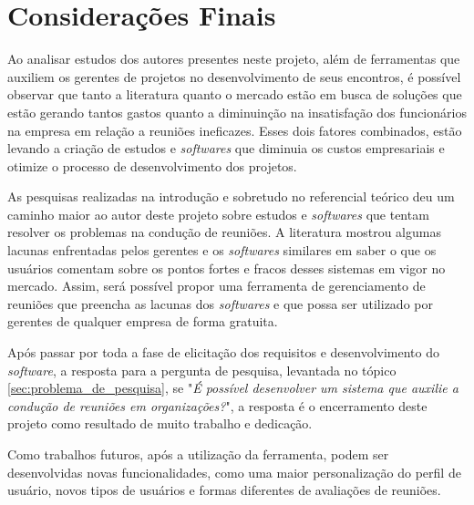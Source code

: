\chapter{Considerações Finais}
\label{cp:consideracoes}

Ao analisar estudos dos autores presentes neste projeto, além de ferramentas que auxiliem os gerentes de projetos no desenvolvimento de seus encontros, é possível observar que tanto a literatura quanto o mercado estão em busca de soluções que estão gerando tantos gastos quanto a diminuinção na insatisfação dos funcionários na empresa em relação a reuniões ineficazes. Esses dois fatores combinados, estão levando a criação de estudos e \textit{softwares} que diminuia os custos empresariais e otimize o processo de desenvolvimento dos projetos.

As pesquisas realizadas na introdução e sobretudo no referencial teórico deu um caminho maior ao autor deste projeto sobre estudos e \textit{softwares} que tentam resolver os problemas na condução de reuniões. A literatura mostrou algumas lacunas enfrentadas pelos gerentes e os \textit{softwares} similares em saber o que os usuários comentam sobre os pontos fortes e fracos desses sistemas em vigor no mercado. Assim, será possível propor uma ferramenta de gerenciamento de reuniões que preencha as lacunas dos \textit{softwares} e que possa ser utilizado por gerentes de qualquer empresa de forma gratuita.

Após passar por toda a fase de elicitação dos requisitos e desenvolvimento do \textit{software}, a resposta para a pergunta de pesquisa, levantada no tópico \ref{sec:problema_de_pesquisa}, se "\textit{É possível desenvolver um sistema que auxilie a condução de reuniões em organizações?}", a resposta é o encerramento deste projeto como resultado de muito trabalho e dedicação. 

Como trabalhos futuros, após a utilização da ferramenta, podem ser desenvolvidas novas funcionalidades, como uma maior personalização do perfil de usuário, novos tipos de usuários e formas diferentes de avaliações de reuniões.